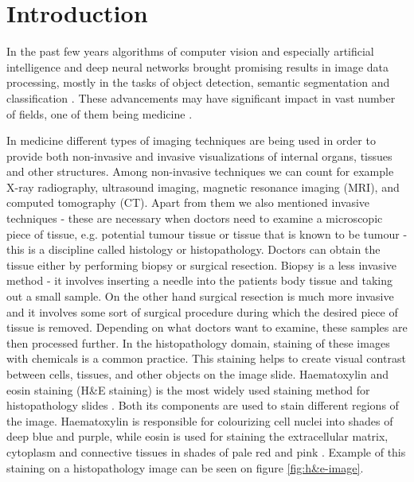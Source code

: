 \chapter{Introduction}


In the past few years algorithms of computer vision and especially artificial intelligence and deep neural networks brought promising results in image data processing, mostly in the tasks of object detection, semantic segmentation and classification \cite{LeCun2015}. These advancements may have significant impact in vast number of fields, one of them being medicine \cite{Hu2023, He2023, Wemmert2021}. 

In medicine different types of imaging techniques are being used in order to provide both non-invasive and invasive visualizations of internal organs, tissues and other structures. Among non-invasive techniques we can count for example X-ray radiography, ultrasound imaging, magnetic resonance imaging (MRI), and computed tomography (CT). Apart from them we also mentioned invasive techniques - these are necessary when doctors need to examine a microscopic piece of tissue, e.g. potential tumour tissue or tissue that is known to be tumour - this is a discipline called histology or histopathology. Doctors can obtain the tissue either by performing biopsy or surgical resection. Biopsy is a less invasive method - it involves inserting a needle into the patients body tissue and taking out a small sample. On the other hand surgical resection is much more invasive and it involves some sort of surgical procedure during which the desired piece of tissue is removed. Depending on what doctors want to examine, these samples are then processed further. In the histopathology domain, staining of these images with chemicals is a common practice. This staining helps to create visual contrast between cells, tissues, and other objects on the image slide. Haematoxylin and eosin staining (H\&E staining) is the most widely used staining method for histopathology slides \cite{Dey2022}. Both its components are used to stain different regions of the image. Haematoxylin is responsible for colourizing cell nuclei into shades of deep blue and purple, while eosin is used for staining the extracellular matrix, cytoplasm and connective tissues in shades of pale red and pink \cite{Dey2022}. Example of this staining on a histopathology image can be seen on figure \ref{fig:h&e-image}.

